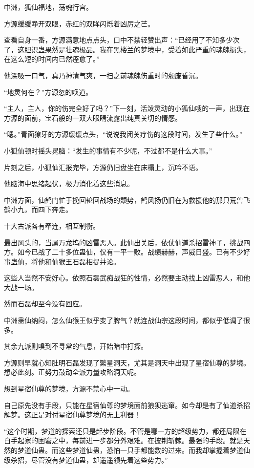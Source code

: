 
\begin{this_body}

中洲，狐仙福地，荡魂行宫。

方源缓缓睁开双眼，赤红的双眸闪烁着凶厉之芒。

查看自身一番，方源满意地点点头，口中不禁轻赞出声：“已经用了不知多少次了，这胆识蛊果然是壮魂极品。我在黑楼兰的梦境中，受着如此严重的魂魄损失，在这么短的时间内已然痊愈了。”

他深吸一口气，真乃神清气爽，一扫之前魂魄伤重时的颓废昏沉。

“地灵何在？”方源忽的唤道。

“主人，主人，你的伤完全好了吗？”下一刻，活泼灵动的小狐仙嗖的一声，出现在方源的面前，宝石般的一双大眼睛流露出纯真关切的情感。

“嗯。”青面獠牙的方源缓缓点头，“说说我闭关疗伤的这段时间，发生了些什么。”

小狐仙顿时摇头晃脑：“发生的事情有不少呢，不过都不是什么大事。”

片刻之后，小狐仙汇报完毕，方源仍旧盘坐在床榻上，沉吟不语。

他脑海中思绪起伏，极力消化着这些消息。

中洲方面，仙鹤门忙于挽回轮回战场的颓势，鹤风扬仍旧在为救援他的那只荒兽飞鹤小九，而四下奔走。

十大古派各有牵连，相互制衡。

最出风头的，当属万龙坞的凶雷恶人。此仙出关后，依仗仙道杀招雷神子，挑战四方。如今已战了二十多位蛊仙，仅有一平一败。战绩赫赫，声威日盛。已有不少好事蛊仙，将他和仙猴王石磊相提并论。

这些人当然不安好心。依照石磊武痴战狂的性情，必然要主动找上凶雷恶人，和他大战一场。

然而石磊却至今没有回应。

中洲蛊仙纳闷，怎么仙猴王似乎变了脾气？就连战仙宗这段时间，都似乎低调了很多。

其余九派则嗅到不寻常的气息，开始暗中打探。

方源则早就心知肚明石磊发现了繁星洞天，尤其是洞天中出现了星宿仙尊的梦境。想必此刻。正努力鼓动全派力量攻略洞天呢。

想到星宿仙尊的梦境，方源不禁心中一动。

自己原先没有手段，只能在星宿仙尊的梦境面前狼狈逃窜。如今却是有了仙道杀招解梦。这正是对付星宿仙尊梦境的无上利器！

“这个时期，梦道的探索还只是起步阶段。不管是哪一方的超级势力，都还局限在白手起家的困窘之中，每前进一步都分外艰难。在披荆斩棘。最强的手段。就是天然的梦道仙蛊。而这些梦道仙蛊，恐怕一只手都能数的过来。而我却掌握着梦道仙级杀招，尽管没有梦道仙蛊，却遥遥领先着这些势力。”


\end{this_body}

